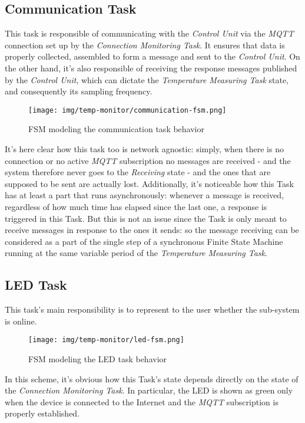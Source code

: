 \documentclass[a4paper,12pt]{report}
\begin{document}
		\subsection{Communication Task}
		This task is responsible of communicating with the \textit{Control Unit} via the \textit{MQTT} connection set up by the \textit{Connection Monitoring Task}. It ensures that data is properly collected, assembled to form a message and sent to the \textit{Control Unit}. On the other hand, it's also responsible of receiving the response messages published by the \textit{Control Unit}, which can dictate the \textit{Temperature Measuring Task} state, and consequently its sampling frequency.
		\begin{figure}[H]
			\centering{}
			\texttt{[image: img/temp-monitor/communication-fsm.png]}
			\caption{FSM modeling the communication task behavior}
			\label{img:temp-monitor/communication-fsm}
		\end{figure}
		It's here clear how this task too is network agnostic: simply, when there is no connection or no active \textit{MQTT} subscription no messages are received - and the system therefore never goes to the \textit{Receiving} state - and the ones that are supposed to be sent are actually lost.
		\newline Additionally, it's noticeable how this Task has at least a part that runs asynchronously: whenever a message is received, regardless of how much time has elapsed since the last one, a response is triggered in this Task. But this is not an issue since the Task is only meant to receive messages in response to the ones it sends: so the message receiving can be considered as a part of the single step of a synchronous Finite State Machine running at the same variable period of the \textit{Temperature Measuring Task}.
		\subsection{LED Task}
		This task's main responsibility is to represent to the user whether the sub-system is online.
		\begin{figure}[H]
			\centering{}
			\texttt{[image: img/temp-monitor/led-fsm.png]}
			\caption{FSM modeling the LED task behavior}
			\label{img:temp-monitor/led-fsm}
		\end{figure}
		In this scheme, it's obvious how this Task's state depends directly on the state of the \textit{Connection Monitoring Task}. In particular, the LED is shown as green only when the device is connected to the Internet and the \textit{MQTT} subscription is properly established.
\end{document}
